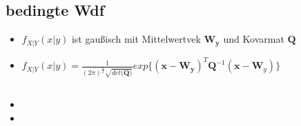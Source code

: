 \documentclass{article}
\begin{document}
\subsection{bedingte Wdf}
\begin{itemize}
\item $f_{X|Y}(x|y)$ ist gau\ss isch mit Mittelwertvek $\bm{W_y}$ und Kovarmat $\bm{Q}$
\item $f_{X|Y}(x|y) = \frac{1}{(2\pi)^{\frac{n}{2}}\sqrt{det(\bm{Q)}}}exp\{(\bm{x-W_y})^T \bm{Q}^{-1}(\bm{x}-\bm{W}_y) \} $
\end{itemize}



\subsection{}
\begin{itemize}
\item
\item
\end{itemize}
\end{document}
